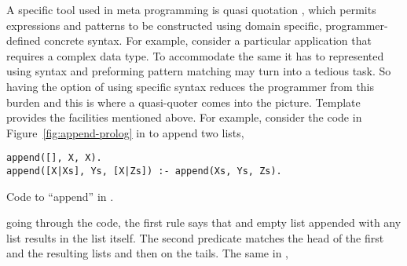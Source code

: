 \documentclass[thesis-solanki.tex]{subfiles}
\begin{document}
A specific tool used in meta programming is quasi quotation
\cite{mainland2007s,haskellquasi,wikiquasi},
which permits
 expressions and patterns to be constructed using domain specific, pro\-gram\-mer-de\-fined concrete
syntax.
For example, consider a particular application that requires a complex data type.
To accommodate the same it has to represented using  syntax and preforming
pattern matching may
turn into a tedious task.
So having the option of using specific syntax reduces the programmer from this burden and this is where a
quasi-quoter comes into the picture.
Template  provides the facilities mentioned above.
For example, consider the code in Figure~\ref{fig:append-prolog}
in  to append two lists,
\begin{code-list}[h]
\begin{verbatim}
append([], X, X).
append([X|Xs], Ys, [X|Zs]) :- append(Xs, Ys, Zs).
\end{verbatim}    
\vspace*{-0.8\baselineskip}
\caption{Code to ``append'' in \protect{}.}
\label{fig:append-prolog}
\end{code-list}
going through the code, the first rule says that and empty list appended with any list results in the list itself.
The second predicate matches the head of the first and the resulting
lists and then  on the tails. 
The same in ,
\inputminted[linenos]{haskell}{append.pl}
\end{document}
